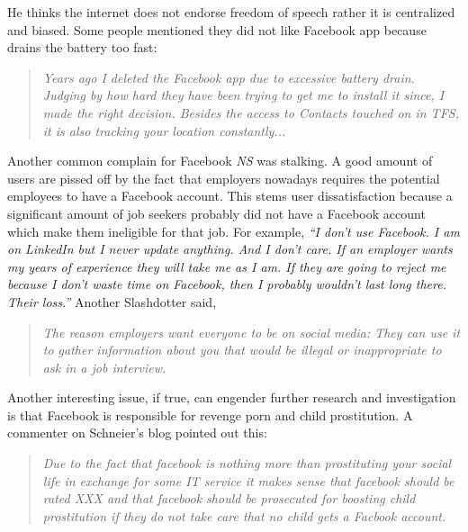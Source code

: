 He thinks the internet does not endorse freedom of speech rather it is centralized and biased. Some people mentioned they did not like Facebook app because drains the battery too fast:
\begin{quote}
         \textit{Years ago I deleted the Facebook app due to excessive battery drain. Judging by how hard they have been trying to get me to install it since, I made the right decision. Besides the access to Contacts touched on in TFS, it is also tracking your location constantly...}
    \end{quote}
    
Another common complain for Facebook \emph{NS} was stalking. A good amount of users are pissed off by the fact that employers nowadays requires the potential employees to have a Facebook account. This stems user dissatisfaction because a significant amount of job seekers probably did not have a Facebook account which make them ineligible for that job. For example, \textit{``I don't use Facebook. I am on LinkedIn but I never update anything. And I don't care. If an employer wants my years of experience they will take me as I am. If they are going to reject me because I don't waste time on Facebook, then I probably wouldn't last long there. Their loss.''} Another Slashdotter said,
     \begin{quote}
         \textit{The reason employers want everyone to be on social media: They can use it to gather information about you that would be illegal or inappropriate to ask in a job interview. }
     \end{quote}
     
Another interesting issue, if true, can engender further research and investigation is that Facebook is responsible for revenge porn and child prostitution. A commenter on Schneier's blog pointed out this:
\begin{quote}
         \textit{Due to the fact that facebook is nothing more than prostituting your social life in exchange for some IT service it makes sense that facebook should be rated XXX and that facebook should be prosecuted for boosting child prostitution if they do not take care that no child gets a Facbook account.}
    \end{quote}
 
 

